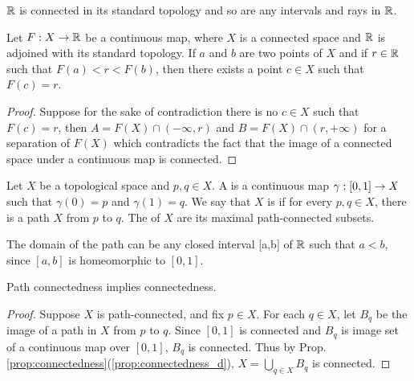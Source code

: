 \documentclass[11pt,a4paper]{article}
\begin{document}
\begin{lemma}
$\mathbb{R}$ is connected in its standard topology and so are any intervals and rays in $\mathbb{R}$.
\end{lemma}

\begin{proposition}
Let $F:X\rightarrow \mathbb{R}$ be a continuous map, where $X$ is a connected space and $\mathbb{R}$ is adjoined with its standard topology. If $a$ and $b$ are two points of $X$ and if $r\in \mathbb{R}$ such that $F(a)<r<F(b)$, then there exists a point $c\in X$ such that $F(c) = r$.
\end{proposition}

\begin{proof}
Suppose for the sake of contradiction there is no $c\in X$ such that $F(c) = r$, then $A = F(X)\cap (-\infty,r)$ and $B = F(X)\cap(r,+\infty)$ for a separation of $F(X)$ which contradicts the fact that the image of a connected space under a continuous map is connected.
\end{proof}

\begin{definition}
Let $X$ be a topological space and $p,q\in X$. A  is a continuous map $\gamma:[0,1]\rightarrow X$ such that $\gamma(0) = p$ and $\gamma(1) = q$. We say that $X$ is  if for every $p,q\in X$, there is a path $X$ from $p$ to $q$. The  of ${X}$ are its maximal path-connected subsets.
\end{definition}

\begin{remark}
The domain of the path can be any closed interval [a,b] of $\mathbb{R}$ such that $a<b$, since $[a,b]$ is homeomorphic to $[0,1]$.
\end{remark}

\begin{proposition}\label{prop:path_connectedness_implies_connectedness}
Path connectedness implies connectedness.
\end{proposition}

\begin{proof}
Suppose $X$ is path-connected, and fix $p\in X$. For each $q\in X$, let $B_q$ be the image of a path in $X$ from $p$ to $q$. Since $[0,1]$ is connected and $B_q$ is image set of a continuous map over $[0,1]$, $B_q$ is connected. Thus by Prop. \ref{prop:connectedness}(\ref{prop:connectedness_d}), $X=\bigcup_{q\in X} B_q$ is connected.
\end{proof}
\end{document}

